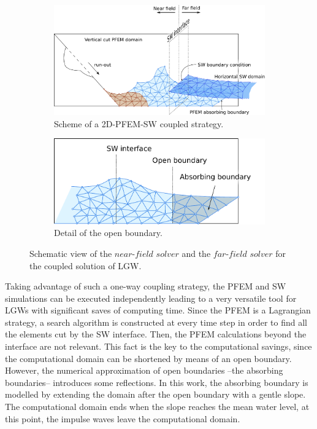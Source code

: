 \begin{figure} [htb]
    \begin{subfigure}{\textwidth}
        \centering
        \includegraphics[width=\columnwidth]{img/coupling/modelView.pdf}
        \caption{Scheme of a 2D-PFEM-SW coupled strategy.}
        \label{coupling_model_simplified}
        \vspace{1em}
    \end{subfigure}
    \begin{subfigure}{\textwidth}
        \centering
        \includegraphics[width=\columnwidth]{img/coupling/open_boundary.pdf}
        \caption{Detail of the open boundary.}
        \label{coupling_model_boundary}
    \end{subfigure}
    \caption{Schematic view of the $near$-$field$ $solver$ and the $far$-$field$ $solver$ for the coupled solution of LGW.}        
    \label{coupling_model_scheme}
\end{figure}



Taking advantage of such a one-way coupling strategy, the PFEM and SW simulations can be executed independently leading to a very versatile tool for LGWs with significant saves of computing time.
Since the PFEM is a Lagrangian strategy, a search algorithm is constructed at every time step in order to find all the elements cut by the SW interface.
Then, the PFEM calculations beyond the interface are not relevant. This fact is the key to the computational savings, since the computational domain can be shortened by means of an open boundary. However, the numerical approximation of open boundaries --the absorbing boundaries-- introduces some reflections. In this work, the absorbing boundary is 
modelled by extending the domain after the open boundary with a gentle slope. The computational domain ends when the slope reaches the mean water level, at this point, the impulse waves leave the computational domain.

